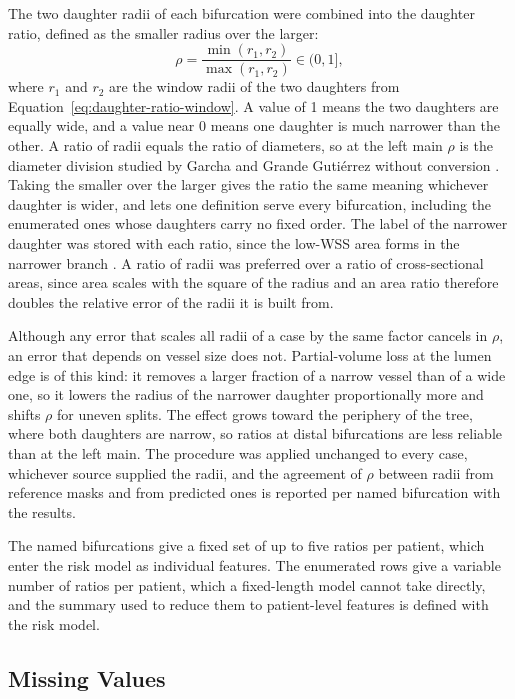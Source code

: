 The two daughter radii of each bifurcation were combined into the daughter ratio, defined as the smaller radius over the larger:
\begin{equation}
  \rho = \frac{\min(r_1, r_2)}{\max(r_1, r_2)} \in (0, 1],
  \label{eq:daughter-ratio}
\end{equation}
where $r_1$ and $r_2$ are the window radii of the two daughters from Equation~\ref{eq:daughter-ratio-window}.
A value of 1 means the two daughters are equally wide, and a value near 0 means one daughter is much narrower than the other.
A ratio of radii equals the ratio of diameters, so at the left main $\rho$ is the diameter division studied by Garcha and Grande Guti\'errez without conversion \cite{garcha2025sensitivity}.
Taking the smaller over the larger gives the ratio the same meaning whichever daughter is wider, and lets one definition serve every bifurcation, including the enumerated ones whose daughters carry no fixed order.
The label of the narrower daughter was stored with each ratio, since the low-WSS area forms in the narrower branch \cite{garcha2025sensitivity}.
A ratio of radii was preferred over a ratio of cross-sectional areas, since area scales with the square of the radius and an area ratio therefore doubles the relative error of the radii it is built from.

Although any error that scales all radii of a case by the same factor cancels in $\rho$, an error that depends on vessel size does not.
Partial-volume loss at the lumen edge is of this kind: it removes a larger fraction of a narrow vessel than of a wide one, so it lowers the radius of the narrower daughter proportionally more and shifts $\rho$ for uneven splits.
The effect grows toward the periphery of the tree, where both daughters are narrow, so ratios at distal bifurcations are less reliable than at the left main.
The procedure was applied unchanged to every case, whichever source supplied the radii, and the agreement of $\rho$ between radii from reference masks and from predicted ones is reported per named bifurcation with the results.

The named bifurcations give a fixed set of up to five ratios per patient, which enter the risk model as individual features.
The enumerated rows give a variable number of ratios per patient, which a fixed-length model cannot take directly, and the summary used to reduce them to patient-level features is defined with the risk model.

\subsection{Missing Values}
\label{sec:daughter-ratio-missing}

